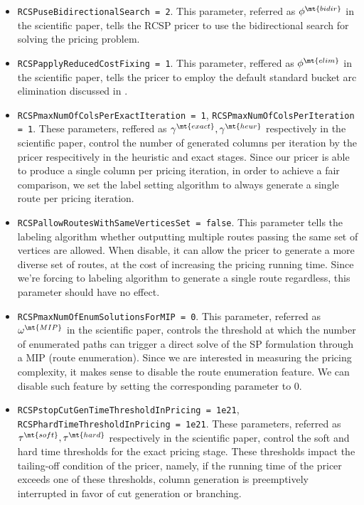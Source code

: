 \begin{itemize}
	\item \texttt{RCSPuseBidirectionalSearch = 2}.
	      This parameter, referred as $\phi^\mt{bidir}$ in the scientific paper,
	      tells the RCSP pricer to use the bidirectional search for solving the pricing problem.
	\item \texttt{RCSPapplyReducedCostFixing = 1}.
	      This parameter, reffered as $\phi^\mt{elim}$ in the scientific paper,
	      tells the pricer to employ the default standard bucket arc elimination discussed in \textcite{sadykov2021a}.
	\item \texttt{RCSPmaxNumOfColsPerExactIteration = 1}, \texttt{RCSPmaxNumOfColsPerIteration = 1}.
	      These parameters, reffered as $\gamma^\mt{exact}, \gamma^\mt{heur}$ respectively in the scientific paper,
	      control the number of generated columns per iteration by the pricer respecitively in the heuristic and exact stages.
	      Since our pricer is able to produce a single column per pricing iteration, in order to achieve a fair comparison,
	      we set the label setting algorithm to always generate a single route per pricing iteration.
	\item \texttt{RCSPallowRoutesWithSameVerticesSet = false}.
	      This parameter tells the labeling algorithm whether outputting multiple routes passing the same set of vertices are allowed.
	      When disable, it can allow the pricer to generate a more diverse set of routes, at the cost of increasing the pricing running time.
	      Since we're forcing to labeling algorithm to generate a single route regardless, this parameter should have no effect.
	\item \texttt{RCSPmaxNumOfEnumSolutionsForMIP = 0}.
	      This parameter, referred as $\omega^\mt{MIP}$ in the scientific paper,
	      controls the threshold at which the number of enumerated paths can trigger a direct solve of the SP formulation through a MIP (route enumeration).
	      Since we are interested in measuring the pricing complexity, it makes sense to disable the route enumeration feature.
	      We can disable such feature by setting the corresponding parameter to $0$.
	\item \texttt{RCSPstopCutGenTimeThresholdInPricing = 1e21}, \texttt{RCSPhardTimeThresholdInPricing = 1e21}.
	      These parameters, referred as $\tau^\mt{soft}, \tau^\mt{hard}$ respectively in the scientific paper,
	      control the soft and hard time thresholds for the exact pricing stage.
	      These thresholds impact the tailing-off condition of the pricer, namely, if the running time of the pricer exceeds one of these thresholds, column generation is preemptively interrupted in favor of cut generation or branching.

\end{itemize}
